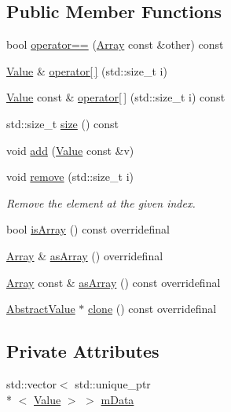 \subsection*{Public Member Functions}
\begin{DoxyCompactItemize}
\item 
bool \hyperlink{classj_1_1impl_1_1_array_a8878b0cfe7cac5a0d91d9f98ecc97e96}{operator==} (\hyperlink{classj_1_1impl_1_1_array}{Array} const \&other) const 
\item 
\hyperlink{classj_1_1_value}{Value} \& \hyperlink{classj_1_1impl_1_1_array_ae097ea32c79bd892dadd5d8e56190906}{operator\mbox{[}$\,$\mbox{]}} (std\-::size\-\_\-t i)
\item 
\hyperlink{classj_1_1_value}{Value} const \& \hyperlink{classj_1_1impl_1_1_array_ac77cb712be4576f67560a71afeb120df}{operator\mbox{[}$\,$\mbox{]}} (std\-::size\-\_\-t i) const 
\item 
std\-::size\-\_\-t \hyperlink{classj_1_1impl_1_1_array_af1c23f03a9674fceb428b0f8255d4c98}{size} () const 
\item 
void \hyperlink{classj_1_1impl_1_1_array_a595fc651cf671593884893cc0635d586}{add} (\hyperlink{classj_1_1_value}{Value} const \&v)
\item 
void \hyperlink{classj_1_1impl_1_1_array_ac00ba23436b735aa2e29de69a86dd6fd}{remove} (std\-::size\-\_\-t i)
\begin{DoxyCompactList}\small\item\em Remove the element at the given index. \end{DoxyCompactList}\item 
bool \hyperlink{classj_1_1impl_1_1_array_af859820f212b3bb3bb93c6bc98e756c1}{is\-Array} () const overridefinal
\item 
\hyperlink{classj_1_1impl_1_1_array}{Array} \& \hyperlink{classj_1_1impl_1_1_array_afbbbbbd781af165452dedda0a7b1ce05}{as\-Array} () overridefinal
\item 
\hyperlink{classj_1_1impl_1_1_array}{Array} const \& \hyperlink{classj_1_1impl_1_1_array_ab4ad4d8cba1ccf25cb209b03fb50573a}{as\-Array} () const overridefinal
\item 
\hyperlink{classj_1_1impl_1_1_abstract_value}{Abstract\-Value} $\ast$ \hyperlink{classj_1_1impl_1_1_array_a94e77caeb46bfcfbbf138fa75076235f}{clone} () const overridefinal
\end{DoxyCompactItemize}
\subsection*{Private Attributes}
\begin{DoxyCompactItemize}
\item 
std\-::vector$<$ std\-::unique\-\_\-ptr\\*
$<$ \hyperlink{classj_1_1_value}{Value} $>$ $>$ \hyperlink{classj_1_1impl_1_1_array_a25b3f62f6ad82d84c3c4a12723dcc070}{m\-Data}
\end{DoxyCompactItemize}


